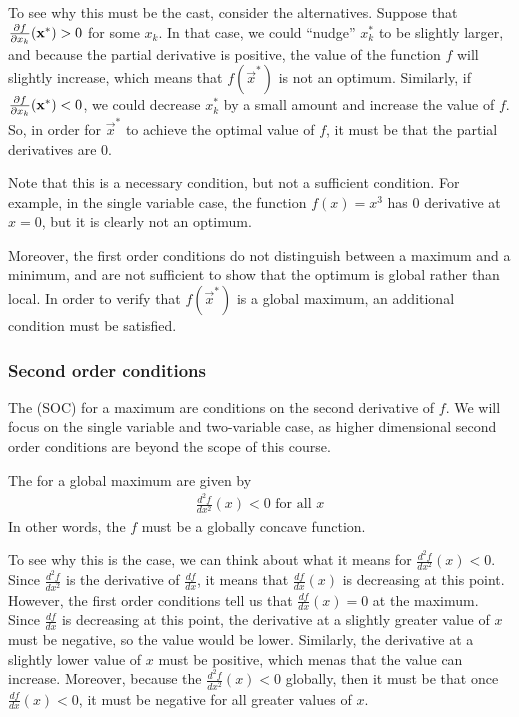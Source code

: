 To see why this must be the cast, consider the alternatives. Suppose that $\frac{\partial f}{\partial x_k}(\mathbf{x}^*) > 0$ for some $x_k$. In that case, we could ``nudge'' $x_k^*$ to be slightly larger, and because the partial derivative is positive, the value of the function $f$ will slightly increase, which means that $f(\vec{x}^*)$ is not an optimum. Similarly, if $\frac{\partial f}{\partial x_k}(\mathbf{x}^*) < 0$, we could decrease $x_k^*$ by a small amount and increase the value of $f$. So, in order for $\vec{x}^*$ to achieve the optimal value of $f$, it must be that the partial derivatives are 0. 

Note that this is a necessary condition, but not a sufficient condition. For example, in the single variable case, the function $f(x) = x^3$ has 0 derivative at $x = 0$, but it is clearly not an optimum. 


Moreover, the first order conditions do not distinguish between a maximum and a minimum, and are not sufficient to show that the optimum is global rather than local. In order to verify that $f(\vec{x}^*)$ is a global maximum, an additional condition must be satisfied. 


\subsubsection*{Second order conditions}
The  (SOC) for a maximum are conditions on the second derivative of $f$. We will focus on the single variable and two-variable case, as higher dimensional second order conditions are beyond the scope of this course.

The  for a global maximum are given by
\begin{align*}
    \frac{d^2f}{dx^2}(x) < 0 \text{ for all $x$}
\end{align*}
In other words, the $f$ must be a globally concave function. 


To see why this is the case, we can think about what it means for $\frac{d^2f}{dx^2}(x) < 0$. Since $\frac{d^2f}{dx^2}$ is the derivative of $\frac{df}{dx}$, it means that $\frac{df}{dx}(x)$ is decreasing at this point. However, the first order conditions tell us that $\frac{df}{dx}(x) = 0$ at the maximum. Since $\frac{df}{dx}$ is decreasing at this point, the derivative at a slightly greater value of $x$ must be negative, so the value would be lower. Similarly, the derivative at a slightly lower value of $x$ must be positive, which menas that the value can increase. Moreover, because the $\frac{d^2f}{dx^2}(x) < 0$ globally, then it must be that once $\frac{df}{dx}(x) < 0$, it must be negative for all greater values of $x$. 

